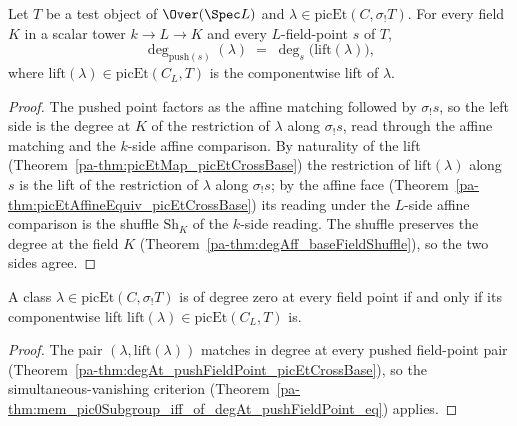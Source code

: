 \begin{theorem}
  \label{pa-thm:degAt_pushFieldPoint_picEtCrossBase}
  \leanok

  Let \(T\) be a test object of \(\Over(\Spec L)\) and
  \(\lambda \in \mathrm{picEt}(C, \sigma_{!}T)\).  For every field \(K\) in a scalar
  tower \(k \to L \to K\) and every \(L\)-field-point \(s\) of \(T\),
  \[
    \deg_{\mathrm{push}(s)}(\lambda)
      \;=\; \deg_{s}\bigl(\mathrm{lift}(\lambda)\bigr),
  \]
  where \(\mathrm{lift}(\lambda) \in \mathrm{picEt}(C_L, T)\) is the componentwise
  lift of \(\lambda\).
\end{theorem}
\begin{proof}
  \leanok
  The pushed point factors as the affine matching followed by \(\sigma_{!}s\), so the
  left side is the degree at \(K\) of the restriction of \(\lambda\) along
  \(\sigma_{!}s\), read through the affine matching and the \(k\)-side affine
  comparison.  By naturality of the lift
  (Theorem~\ref{pa-thm:picEtMap_picEtCrossBase}) the restriction of
  \(\mathrm{lift}(\lambda)\) along \(s\) is the lift of the restriction of \(\lambda\)
  along \(\sigma_{!}s\); by the affine face
  (Theorem~\ref{pa-thm:picEtAffineEquiv_picEtCrossBase}) its reading under the
  \(L\)-side affine comparison is the shuffle \(\mathrm{Sh}_K\) of the \(k\)-side
  reading.  The shuffle preserves the degree at the field \(K\)
  (Theorem~\ref{pa-thm:degAff_baseFieldShuffle}), so the two sides agree.
\end{proof}

\begin{theorem}
  \label{pa-thm:mem_pic0Subgroup_picEtCrossBase_iff}
  \leanok

  A class \(\lambda \in \mathrm{picEt}(C, \sigma_{!}T)\) is of degree zero at every
  field point if and only if its componentwise lift
  \(\mathrm{lift}(\lambda) \in \mathrm{picEt}(C_L, T)\) is.
\end{theorem}
\begin{proof}
  \leanok
  The pair \((\lambda, \mathrm{lift}(\lambda))\) matches in degree at every pushed
  field-point pair (Theorem~\ref{pa-thm:degAt_pushFieldPoint_picEtCrossBase}), so the
  simultaneous-vanishing criterion
  (Theorem~\ref{pa-thm:mem_pic0Subgroup_iff_of_degAt_pushFieldPoint_eq}) applies.
\end{proof}

